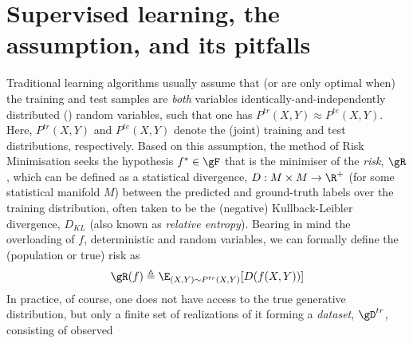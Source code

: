 \section{Supervised learning, the \iid{} assumption, and its pitfalls}\label{sec:iid}

Traditional learning algorithms usually assume  that (or are only optimal when) the training and
test samples are \emph{both} variables identically-and-independently distributed (\iid{}) random
variables, such that one has \( P^{tr}(X, Y) \approx P^{te}(X, Y) \). 
%
Here, \( P^{tr}(X, Y) \) and \( P^{te}(X, Y) \) denote the (joint) training and test distributions,
respectively.
%
Based on this assumption, the method of Risk Minimisation  seeks the hypothesis \( f^\ast \in \gF
\) that is the minimiser of the \emph{risk}, $\gR$, which can be defined as a statistical
divergence, \( D: M \times M \to \R^+ \) (for some statistical manifold \(M\)) between the
predicted and ground-truth labels over the training distribution, often taken to be the (negative)
Kullback-Leibler divergence, \( D_{KL} \) (also known as \emph{relative entropy}).
%
%
Bearing in mind the overloading of \(f\), \wrt{} deterministic and random variables, we can
formally define the (population or true) risk as
%
\begin{equation}\label{eq:pop_risk} \gR (f) \triangleq \E_{ (X, Y) \sim P^{tr}(X, Y) } [ D ( f(X,
    Y) )]
\end{equation}
%
In practice, of course, one does not have access to the true generative distribution, but only a
finite set of realizations of it forming a \emph{dataset}, \( \gD^{tr} \), consisting of observed
